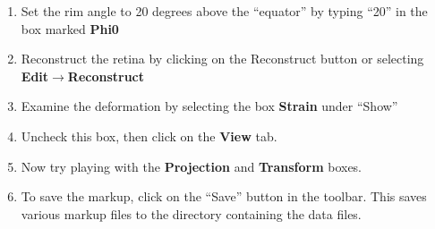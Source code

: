 \documentclass{article}
\begin{document}
\begin{enumerate}
\item Set the rim angle to 20 degrees above the ``equator'' by typing
  ``20'' in the box marked \textbf{Phi0}
\item Reconstruct the retina by clicking on the Reconstruct button or
  selecting \textbf{Edit$\rightarrow$Reconstruct}
\item Examine the deformation by selecting the box \textbf{Strain}
  under ``Show''
\item Uncheck this box, then click on the \textbf{View} tab.
\item Now try playing with the \textbf{Projection} and
  \textbf{Transform} boxes.
\item To save the markup, click on the ``Save'' button in the
  toolbar. This saves various markup files to the directory containing
  the data files. 
\end{enumerate}


\end{document}
